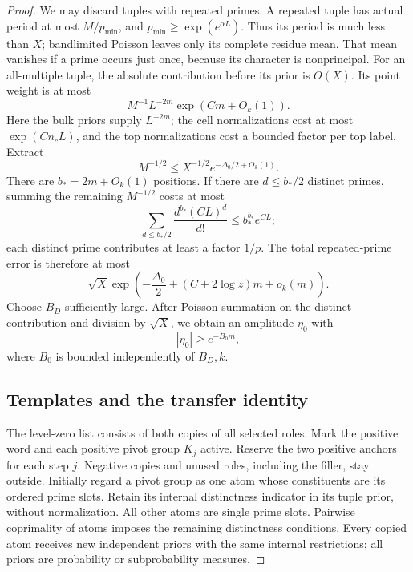 \begin{proof}
We may discard tuples with repeated primes. A repeated tuple has
actual period at most \(M/p_{\min}\), and
\(p_{\min}\ge\exp(e^{\alpha L})\). Thus its period is much less
than \(X\); bandlimited Poisson leaves only its complete residue
mean. That mean vanishes if a prime occurs just once, because its
character is nonprincipal. For an all-multiple tuple, the absolute
contribution before its prior is \(O(X)\).
Its point weight is at most
\[
 M^{-1}L^{-2m}\exp(Cm+O_k(1)).
\]
Here the bulk priors supply \(L^{-2m}\); the cell normalizations
cost at most \(\exp(Cn_cL)\), and the top normalizations cost a
bounded factor per top label.
Extract
\[
 M^{-1/2}\le X^{-1/2}e^{-\Delta_0/2+O_k(1)}.
\]
There are \(b_*=2m+O_k(1)\) positions. If there are \(d\le b_*/2\)
distinct primes, summing the remaining \(M^{-1/2}\) costs at most
\[
 \sum_{d\le b_*/2}\frac{d^{b_*}(CL)^d}{d!}
 \le b_*^{b_*}e^{CL};
\]
each distinct prime contributes at least a factor \(1/p\).
The total repeated-prime error is therefore at most
\[
 \sqrt X\exp\!\left(
   -\frac{\Delta_0}{2}+(C+2\log z)m+o_k(m)\right).
\]
Choose \(B_D\) sufficiently large. After Poisson summation on the
distinct contribution and division by \(\sqrt X\), we obtain an
amplitude \(\eta_0\) with
\begin{equation}\label{eq:src19}
 |\eta_0|\ge e^{-B_0m},
\end{equation}
where \(B_0\) is bounded independently of \(B_D,k\).

\subsection*{Templates and the transfer identity}

The level-zero list consists of both copies of all selected roles.
Mark the positive word and each positive pivot group \(K_j\)
active. Reserve the two positive anchors for each step \(j\).
Negative copies and unused roles, including the filler, stay
outside. Initially regard a pivot group as one atom whose
constituents are its ordered prime slots. Retain its internal
distinctness indicator in its tuple prior, without normalization.
All other atoms are single prime slots. Pairwise coprimality of
atoms imposes the remaining distinctness conditions. Every copied
atom receives new independent priors with the same internal
restrictions; all priors are probability or subprobability measures.


\end{proof}
